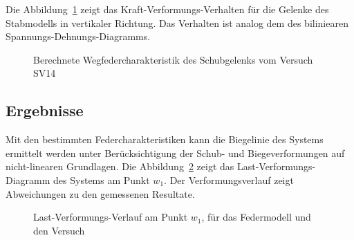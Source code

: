 \documentclass[
  11pt,
  letterpaper,
]{scrreprt}
\begin{document}
Die Abbildung~\ref{fig-wegfeder-schub-sv14} zeigt das
Kraft-Verformungs-Verhalten für die Gelenke des Stabmodells in
vertikaler Richtung. Das Verhalten ist analog dem des biliniearen
Spannungs-Dehnungs-Diagramms.

\begin{figure}[H]


\caption{\label{fig-wegfeder-schub-sv14}Berechnete
Wegfedercharakteristik des Schubgelenks vom Versuch SV14}

\end{figure}%

\subsection{Ergebnisse}\label{ergebnisse-1}

Mit den bestimmten Federcharakteristiken kann die Biegelinie des Systems
ermittelt werden unter Berücksichtigung der Schub- und Biegeverformungen
auf nicht-linearen Grundlagen. Die Abbildung~\ref{fig-l-w-sv14} zeigt
das Last-Verformungs-Diagramm des Systems am Punkt \(w_1\). Der
Verformungsverlauf zeigt Abweichungen zu den gemessenen Resultate.

\begin{figure}[H]


\caption{\label{fig-l-w-sv14}Last-Verformungs-Verlauf am Punkt \(w_1\),
für das Federmodell und den Versuch}

\end{figure}%
\end{document}
